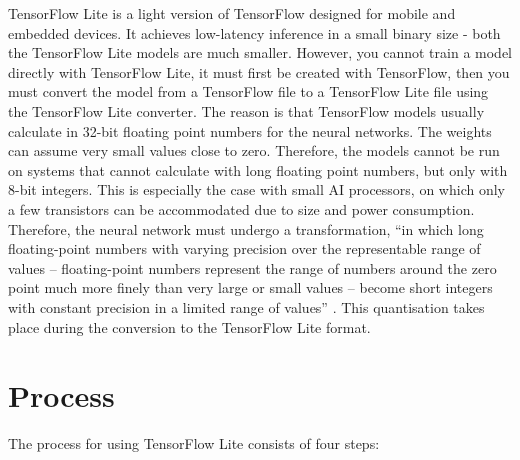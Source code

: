 
TensorFlow Lite is a \glqq light\grqq{} version of TensorFlow designed for mobile and embedded devices. 
It achieves low-latency inference in a small binary size - both the TensorFlow Lite models are much smaller. However, you cannot train a model directly with TensorFlow Lite, it must first be created with TensorFlow, then you must convert the model from a TensorFlow file to a TensorFlow Lite file using the TensorFlow Lite converter.\cite{GoogleCoral:2019}
The reason is that TensorFlow models usually calculate in 32-bit floating point numbers for the neural networks. The weights can assume very small values close to zero. Therefore, the models cannot be run on systems that cannot calculate with long floating point numbers, but only with 8-bit integers. This is especially the case with small AI processors, on which only a few transistors can be accommodated due to size and power consumption. Therefore, the neural network must undergo a transformation, ``in which long floating-point numbers with varying precision over the representable range of values -- floating-point numbers represent the range of numbers around the zero point much more finely than very large or small values -- become short integers with constant precision in a limited range of values'' \cite{Heise:2020}. This quantisation takes place during the conversion to the TensorFlow Lite format.
 
\section{Process}
 
The process for using TensorFlow Lite consists of four steps:
 

